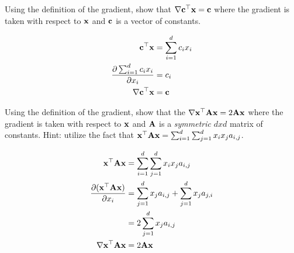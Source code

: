 \documentclass[assignment02_Solutions]{subfiles}
\begin{document}
\begin{exercise}[(25 minutes)]
\bes
\item Using the definition of the gradient, show that $\nabla \mathbf{c}^\top \mathbf{x} = \mathbf{c}$ where the gradient is taken with respect to $\mathbf{x}$ and $\mathbf{c}$ is a vector of constants.

\begin{boxedsolution}

\begin{align}
\mathbf{c}^\top \mathbf{x} &= \sum_{i=1}^d c_i x_i \\
\frac{\partial  \sum_{i=1}^d c_i x_i }{\partial x_i} &= c_i  \\
\nabla \mathbf{c}^\top \mathbf{x} &= \mathbf{c}
\end{align}

\end{boxedsolution}


\item Using the definition of the gradient, show that the $\nabla \mathbf{x}^\top \mathbf{A} \mathbf{x} = 2 \mathbf{A} \mathbf{x}$ where the gradient is taken with respect to $\mathbf{x}$ and $\mathbf{A}$ is a \emph{symmetric} $dxd$ matrix of constants.  Hint: utilize the fact that $\mathbf{x}^\top \mathbf{A} \mathbf{x} = \sum_{i=1}^d\sum_{j=1}^d x_i x_j a_{i, j}$.%
\ees

\begin{boxedsolution}

\begin{align}
\mathbf{x}^\top \mathbf{A} \mathbf{x} &= \sum_{i=1}^d\sum_{j=1}^d   x_i  x_j  a_{i, j} \\
\frac{\partial (\mathbf{x}^\top \mathbf{A} \mathbf{x})}{\partial x_i} &= \sum_{j=1}^d x_j a_{i,j} + \sum_{j=1}^d x_j a_{j, i} \\
&= 2  \sum_{j=1}^d x_j a_{i,j} \\
\nabla \mathbf{x}^\top \mathbf{A} \mathbf{x} &= 2 \mathbf{A}\mathbf{x}
\end{align}

\end{boxedsolution}

\end{exercise}
\end{document}
